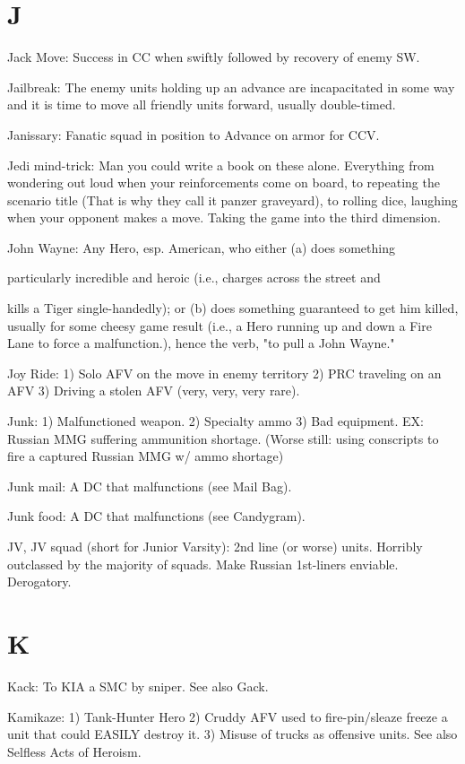 \documentclass[letterpaper]{article}
\begin{document}
\section{J}

Jack Move: Success in CC when swiftly followed by recovery of enemy SW.

Jailbreak: The enemy units holding up an advance are incapacitated in some way and it is time to move all friendly units forward, usually double-timed.

Janissary: Fanatic squad in position to Advance on armor for CCV.

Jedi mind-trick: Man you could write a book on these alone.  Everything from wondering out loud when your reinforcements come on board, to repeating the scenario title (That is why they call it panzer graveyard), to rolling dice, laughing when your opponent makes a move. Taking the game into the third dimension.

John Wayne: Any Hero, esp. American, who either (a) does something

particularly incredible and heroic (i.e., charges across the street and

kills a Tiger single-handedly); or (b) does something guaranteed to get him killed, usually for some cheesy game result (i.e., a Hero running up and down a Fire Lane to force a malfunction.), hence the verb, "to pull a John Wayne."

Joy Ride: 1) Solo AFV on the move in enemy territory 2) PRC traveling on an AFV 3) Driving a stolen AFV (very, very, very rare).

Junk: 1) Malfunctioned weapon. 2) Specialty ammo 3) Bad equipment. EX: Russian MMG suffering ammunition shortage. (Worse still: using conscripts to fire a captured Russian MMG w/ ammo shortage)

Junk mail: A DC that malfunctions (see Mail Bag).

Junk food: A DC that malfunctions (see Candygram).

JV, JV squad (short for Junior Varsity): 2nd line (or worse) units. Horribly outclassed by the majority of squads.  Make Russian 1st-liners enviable. Derogatory.

\section{K}

Kack: To KIA a SMC by sniper. See also Gack.

Kamikaze: 1) Tank-Hunter Hero 2) Cruddy AFV used to fire-pin/sleaze freeze a unit that could EASILY destroy it. 3) Misuse of trucks as offensive units. See also Selfless Acts of Heroism.
\end{document}
